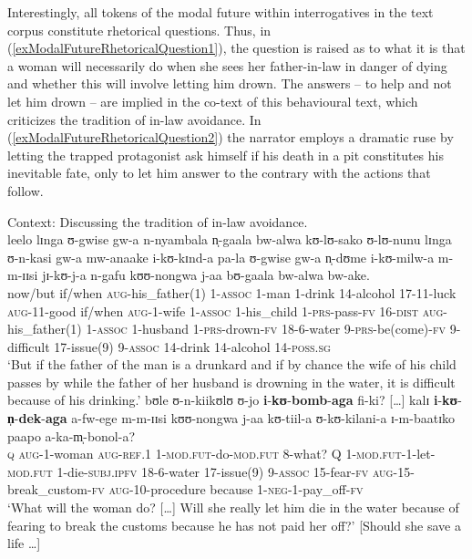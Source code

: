 Interestingly, all tokens of the modal future within interrogatives in the text corpus constitute rhetorical questions. Thus, in (\ref{exModalFutureRhetoricalQuestion1}), the question is raised as to what it is that a woman will necessarily do when she sees her father-in-law in danger of dying and whether this will involve letting him drown. The answers -- to help and not let him drown -- are implied in the co-text of this behavioural text, which criticizes the tradition of in-law avoidance. In (\ref{exModalFutureRhetoricalQuestion2}) the narrator employs a dramatic ruse by letting the trapped protagonist ask himself if his death in a pit constitutes his inevitable fate, only to let him answer to the contrary with the actions that follow.

\begin{exe}
\ex\label{exModalFutureRhetoricalQuestion1}
Context: Discussing the tradition of in-law avoidance.\\
\gll leelo lɪnga ʊ-gwise gw-a n-nyambala n̩-gaala bw-alwa kʊ-lʊ-sako ʊ-lʊ-nunu lɪnga ʊ-n-kasi gw-a mw-anaake i-kʊ-kɪnd-a pa-la ʊ-gwise gw-a n̩-dʊme i-kʊ-milw-a m-m-ɪɪsi jɪ-kʊ-j-a n-gafu kʊʊ-nongwa j-aa bʊ-gaala bw-alwa bw-ake.\\
now/but if/when \textsc{aug}-his\_father(1) 1-\textsc{assoc} 1-man 1-drink 14-alcohol 17-11-luck \textsc{aug}-11-good if/when \textsc{aug}-1-wife 1-\textsc{assoc} 1-his\_child 1-\textsc{prs}-pass-\textsc{fv} 16-\textsc{dist} \textsc{aug}-his\_father(1) 1-\textsc{assoc} 1-husband 1-\textsc{prs}-drown-\textsc{fv} 18-6-water 9-\textsc{prs}-be(come)-\textsc{fv} 9-difficult 17-issue(9) 9-\textsc{assoc} 14-drink 14-alcohol 14-\textsc{poss.sg}\\
\glt \lq But if the father of the man is a drunkard and if by chance the wife of his child passes by while the father of her husband is drowning in the water, it is difficult because of his drinking.'
\sn \gll bʊle ʊ-n-kiikʊlʊ ʊ-jo \textbf{i}-\textbf{kʊ}-\textbf{bomb}-\textbf{aga} fi-ki? [\dots] kalɪ \textbf{i}-\textbf{kʊ}-\textbf{n̩}-\textbf{dek}-\textbf{aga} a-fw-ege m-m-ɪɪsi kʊʊ-nongwa j-aa kʊ-tiil-a ʊ-kʊ-kilani-a ɪ-m-baatɪko paapo a-ka-m̩-bonol-a?\\
\textsc{q} \textsc{aug}-1-woman \textsc{aug}-\textsc{ref.1} 1-\textsc{mod.fut}-do-\textsc{mod.fut} 8-what? {} Q 1-\textsc{mod.fut}-1-let-\textsc{mod.fut} 1-die-\textsc{subj.ipfv} 18-6-water 17-issue(9) 9-\textsc{assoc} 15-fear-\textsc{fv} \textsc{aug}-15-break\_custom-\textsc{fv} \textsc{aug}-10-procedure because 1-\textsc{neg}-1-pay\_off-\textsc{fv}\\
\glt \lq What will the woman do? [\ldots] Will she really let him die in the water because of fearing to break the customs because he has not paid her off?' [Should she save a life \ldots]


\end{exe}
